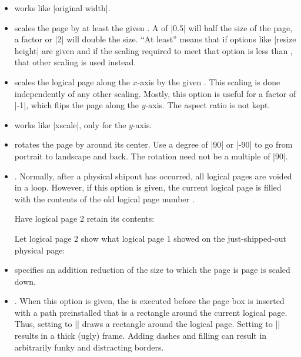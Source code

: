 \begin{command}{\pgfpageslogicalpageoptions{}}
\begin{itemize}
    You need this option only for special logical pages that have
    a height or width different from the normal one and for which you
    will (later on) set these sizes yourself.
  \item
    works like |original width|.
  \item
    scales the page by at least the given . A
     of |0.5| will half the size of the page, a factor or
    |2| will double the size. ``At least'' means that if options like
    |resize height| are given and if the scaling required to meet that
    option is less than , that other scaling is used
    instead.
  \item
    scales the logical page along the $x$-axis by the given
    . This scaling is done independently of any other
    scaling. Mostly, this option is useful for a factor of |-1|, which
    flips the page along the $y$-axis. The aspect ratio is not kept.
  \item
    works like |xscale|, only for the $y$-axis.
  \item
    rotates the page by  around its center. Use a degree
    of |90| or |-90| to go from portrait to landscape and back. The
    rotation need not be a multiple of |90|.
  \item
    .
    Normally, after a physical shipout has occurred, all logical pages
    are voided in a loop. However, if this option is given, the
    current logical page is filled with the contents of the old
    logical page number .

    \example Have logical page 2 retain its contents:
\begin{codeexample}
\end{codeexample}

    \example Let logical page 2 show what logical page 1 showed on the
    just-shipped-out physical page:
\begin{codeexample}
\end{codeexample}
  \item
    specifies an addition reduction of the size to which the page is
    page is scaled down.
  \item
    .
    When this option is given, the  is executed before the
    page box is inserted with a path preinstalled that is a rectangle
    around the current logical page. Thus, setting  to
    |\pgfstroke| draws a rectangle around the logical page. Setting
     to |\pgfsetlinewidth{3pt}\pgfstroke| results in a
    thick (ugly) frame. Adding dashes and filling can result in
    arbitrarily funky and distracting borders.


\end{itemize}
\end{command}
